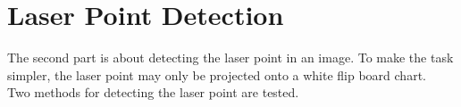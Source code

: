 \documentclass[./\jobname.tex]{subfiles}
\begin{document}
\begin{figure}[h]
	\centering
	\noindent{}
	\label{fig:cam_cal_app_flowchart}
\end{figure}

\section{Laser Point Detection}
The second part is about detecting the laser point in an image. To make the task simpler, the laser point may only be projected onto a white flip board chart. \\
Two methods for detecting the laser point are tested. 
\end{document}
